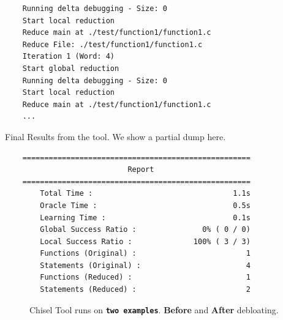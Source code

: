 \documentclass{article} %
\begin{document}
\begin{lstlisting}
	Running delta debugging - Size: 0
	Start local reduction
	Reduce main at ./test/function1/function1.c
	Reduce File: ./test/function1/function1.c
	Iteration 1 (Word: 4)
	Start global reduction
	Running delta debugging - Size: 0
	Start local reduction
	Reduce main at ./test/function1/function1.c
	...
\end{lstlisting}

Final Results from the tool. We show a partial dump here. 

\begin{lstlisting}
	====================================================
							Report                       
	====================================================
		Total Time :                                1.1s
		Oracle Time :                               0.5s
		Learning Time :                             0.1s
		Global Success Ratio :               0% ( 0 / 0)
		Local Success Ratio :              100% ( 3 / 3)
		Functions (Original) :                         1
		Statements (Original) :                        4
		Functions (Reduced) :                          1
		Statements (Reduced) :                         2
\end{lstlisting}

\begin{figure}%
	\centering
	\qquad
	\caption{Chisel Tool runs on \textbf{\texttt{two examples}}. \textbf{\color{red} Before} and \textbf{\color{ao(english)} After} debloating.}%
	\label{fig:example1}%
\end{figure}
\end{document}
